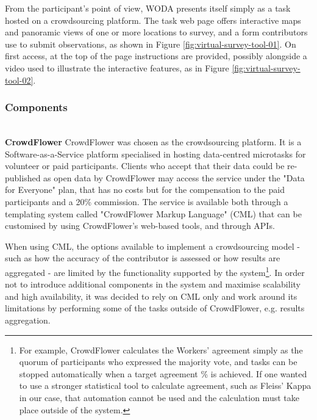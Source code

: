 From the participant's point of view, WODA presents itself simply as a task hosted on a crowdsourcing platform. The task web page offers interactive maps and panoramic views of one or more locations to survey, and a form contributors use to submit observations, as shown in Figure \ref{fig:virtual-survey-tool-01}. On first access, at the top of the page instructions are provided, possibly alongside a video used to illustrate the interactive features, as in Figure \ref{fig:virtual-survey-tool-02}.

\begin{figure}[!ht]
    \begin{floatrow}
    \end{floatrow}
\end{figure}

\subsubsection{Components} \leavevmode \\ %

\textbf{CrowdFlower} CrowdFlower was chosen as the crowdsourcing platform. It is a Software-as-a-Service platform specialised in hosting data-centred microtasks for volunteer or paid participants. Clients who accept that their data could be re-published as open data by CrowdFlower may access the service under the "Data for Everyone" plan, that has no costs but for the compensation to the paid participants and a 20\% commission. The service is available both through a templating system called "CrowdFlower Markup Language" (CML) that can be customised by using CrowdFlower's web-based tools, and through APIs. 

When using CML, the options available to implement a crowdsourcing model - such as how the accuracy of the contributor is assessed or how results are aggregated - are limited by the functionality supported by the system\footnote{For example, CrowdFlower calculates the Workers' agreement simply as the quorum of participants who expressed the majority vote, and tasks can be stopped automatically when a target agreement \% is achieved. If one wanted to use a stronger statistical tool to calculate agreement, such as Fleiss' Kappa in our case, that automation cannot be used and the calculation must take place outside of the system.}. In order not to introduce additional components in the system and maximise scalability and high availability, it was decided to rely on CML only and work around its limitations by performing some of the tasks outside of CrowdFlower, e.g. results aggregation. 


